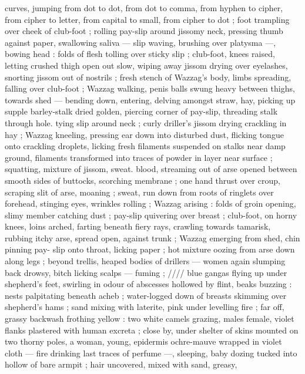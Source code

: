 curves, jumping from dot to dot, from dot to comma, from hyphen to 
cipher, from cipher to letter, from capital to small, from cipher to dot 
; foot trampling over cheek of club-foot ; rolling pay-slip around 
jissomy neck, pressing thumb against paper, swallowing saliva --- 
slip waving, brushing over platysma ---, bowing head : folds of flesh 
tolling over sticky slip ; club-foot, knees raised, letting crushed thigh 
open out slow, wiping away jissom drying over eyelashes, snorting 
jissom out of nostrils ; fresh stench of Wazzag's body, limbs 
spreading, falling over club-foot ; Wazzag walking, penis balls swung 
heavy between thighs, towards shed --- bending down, entering, 
delving amongst straw, hay, picking up supple barley-stalk dried 
golden, piercing corner of pay-slip, threading stalk through hole. 
tying slip around neck ; curly driller's jissom drying crackling in hay 
; Wazzag kneeling, pressing ear down into disturbed dust, flicking 
tongue onto crackling droplets, licking fresh filaments suspended on 
stalks near damp ground, filaments transformed into traces of 
powder in layer near surface ; squatting, mixture of jissom, sweat. 
blood, streaming out of arse opened between smooth sides of 
buttocks, scorching membrane ; one hand thrust over croup, scraping 
slit of arse, moaning ; sweat, run down from roots of ringlets over 
forehead, stinging eyes, wrinkles rolling ; Wazzag arising : folds of 
groin opening, slimy member catching dust ; pay-slip quivering over 
breast ; club-foot, on horny knees, loins arched, farting beneath 
fiery rays, crawling towards tamarisk, rubbing itchy arse, spread 
open, against trunk ; Wazzag emerging from shed, chin pinning pay- 
slip onto throat, licking paper ; hot mixture oozing from arse down 
along legs ; beyond trellis, heaped bodies of drillers --- women 
again slumping back drowsy, bitch licking scalps --- fuming ; {\slash}{\slash}{\slash}{\slash} blue 
gangas flying up under shepherd's feet, swirling in odour of 
abscesses hollowed by flint, beaks buzzing : nests palpitating 
beneath acheb ; water-logged down of breasts skimming over 
shepherd's hams ; sand mixing with laterite, pink under levelling fire 
; far off, grassy backwash frothing yellow : two white camels grazing, 
males female, violet flanks plastered with human excreta ; close by, 
under shelter of skins mounted on two thorny poles, a woman, 
young, epidermis ochre-mauve wrapped in violet cloth --- fire 
drinking last traces of perfume ---, sleeping, baby dozing tucked into 
hollow of bare armpit ; hair uncovered, mixed with sand, greasy, 

